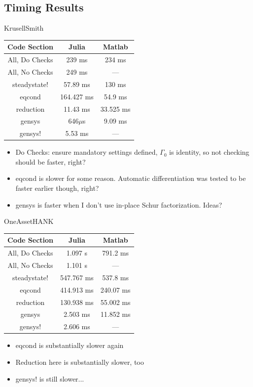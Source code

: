 \documentclass[12 pt, oneside]{article}
\theoremstyle{definition}
\theoremstyle{definition}
\theoremstyle{definition}
\begin{document}
\subsection{Timing Results}
KrusellSmith
  \begin{center}
    \begin{tabular}{|c|c|c|}
      \hline
      Code Section & Julia & Matlab\\
      \hline
      All, Do Checks & 239 ms & 234 ms\\
      All, No Checks & 249 ms & ---\\
      steadystate! & 57.89 ms & 130 ms\\
      eqcond & 164.427 ms & 54.9 ms\\
      reduction & 11.43 ms & 33.525 ms\\
      gensys & 646$\mu$s & 9.09 ms\\
      gensys! & 5.53 ms & ---\\
      \hline
    \end{tabular}
    \begin{itemize}
    \item Do Checks: ensure mandatory settings defined, $\Gamma_0$ is identity, so not checking should be faster, right?
    \item eqcond is slower for some reason. Automatic differentiation was tested to be faster earlier though, right?
    \item gensys is faster when I don't use in-place Schur factorization. Ideas?
    \end{itemize}
  \end{center}

OneAssetHANK
  \begin{center}
    \begin{tabular}{|c|c|c|}
      \hline
      Code Section & Julia & Matlab\\
      \hline
      All, Do Checks & 1.097 s & 791.2 ms\\
      All, No Checks & 1.101 s & ---\\
      steadystate! & 547.767 ms & 537.8 ms\\
      eqcond & 414.913  ms & 240.07 ms\\
      reduction & 130.938 ms & 55.002 ms\\
      gensys & 2.503 ms & 11.852 ms\\
      gensys! & 2.606 ms & ---\\
      \hline
    \end{tabular}
\begin{itemize}
\item eqcond is substantially slower again
\item Reduction here is substantially slower, too
\item gensys! is still slower...
\end{itemize}
  \end{center}
\end{document}
